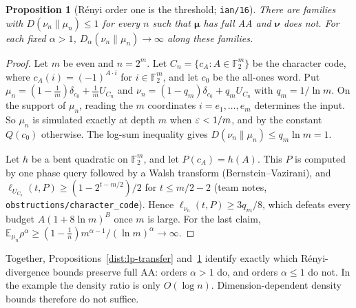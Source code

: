 \documentclass[11pt]{article}
\newtheorem{proposition}[theorem]{Proposition}
\theoremstyle{definition}\newtheorem{definition}[theorem]{Definition}
\theoremstyle{remark}\newtheorem{remark}[theorem]{Remark}
\newcommand{\E}{\mathbb E}\newcommand{\Prb}{\mathbb P}
\begin{document}
\begin{proposition}[Rényi order one is the threshold; \texttt{ian/16}]\label{dist:kl}
There are families with \(D(\nu_n\|\mu_n)\le1\) for every \(n\) such that
\(\boldsymbol\mu\) has full AA and \(\boldsymbol\nu\) does not. For each fixed
\(\alpha>1\), \(D_\alpha(\nu_n\|\mu_n)\to\infty\) along these families.
\end{proposition}
\begin{proof}
Let \(m\) be even and \(n=2^m\). Let
\(C_n=\{c_A:A\in\mathbb F_2^m\}\) be the character code, where
\(c_A(i)=(-1)^{A\cdot i}\) for \(i\in\mathbb F_2^m\), and let \(c_0\) be the
all-ones word. Put
\(\mu_n=(1-\tfrac1m)\delta_{c_0}+\tfrac1mU_{C_n}\) and
\(\nu_n=(1-q_m)\delta_{c_0}+q_mU_{C_n}\) with \(q_m=1/\ln m\). On the support of
\(\mu_n\), reading the \(m\) coordinates \(i=e_1,\dots,e_m\) determines the input.
So \(\mu_n\) is simulated exactly at depth \(m\) when \(\varepsilon<1/m\), and by the
constant \(Q(c_0)\) otherwise. The log-sum inequality gives
\(D(\nu_n\|\mu_n)\le q_m\ln m=1\).

Let \(h\) be a bent quadratic on \(\mathbb F_2^m\), and let \(P(c_A)=h(A)\). This
\(P\) is computed by one phase query followed by a Walsh transform
(Bernstein--Vazirani), and \(\ell_{U_{C_n}}(t,P)\ge(1-2^{t-m/2})/2\) for
\(t\le m/2-2\) (team notes, \texttt{obstructions/character\_code}). Hence
\(\ell_{\nu_n}(t,P)\ge3q_m/8\), which defeats every budget
\(A(1+8\ln m)^B\) once \(m\) is large. For the last claim,
\(\E_{\mu_n}\rho^\alpha\ge(1-\tfrac1n)m^{\alpha-1}/(\ln m)^\alpha\to\infty\).
\end{proof}
Together, Propositions~\ref{dist:lp-transfer} and~\ref{dist:kl} identify
exactly which Rényi-divergence bounds preserve full AA: orders \(\alpha>1\) do,
and orders \(\alpha\le1\) do not. In the example the density ratio is only
\(O(\log n)\). Dimension-dependent density bounds therefore do not suffice.
\end{document}
